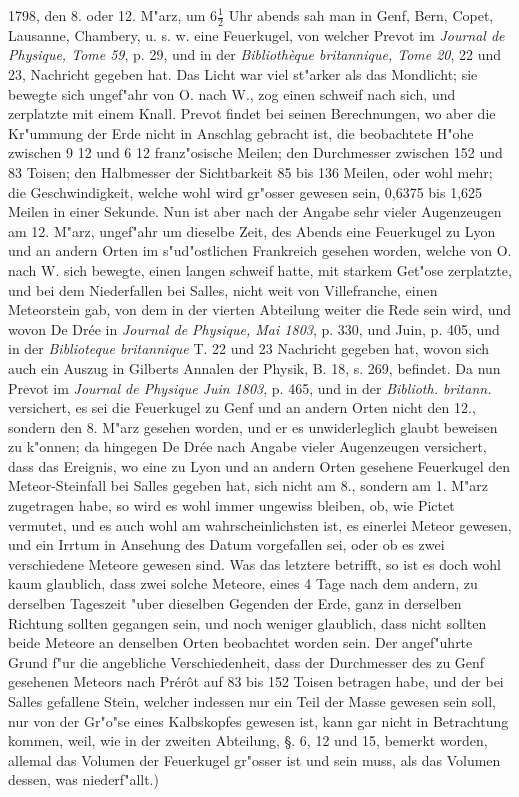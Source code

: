 \documentclass[a4paper, 11pt, oneside, polutonikogreek, german]{article}
\begin{document}
1798, den 8. oder 12. M"arz, um $\mathfrak{6\frac{1}{2}}$ Uhr abends sah man in Genf, Bern, Copet, Lausanne, Chambery, u. s. w. eine Feuerkugel, von welcher Prevot im \emph{Journal de Physique, Tome 59}, p. 29, und in der \emph{Bibliothèque britannique, Tome 20}, 22 und 23, Nachricht gegeben hat. Das Licht war viel st"arker als das Mondlicht; sie bewegte sich ungef"ahr von O. nach W., zog einen schweif nach sich, und zerplatzte mit einem Knall. Prevot findet bei seinen Berechnungen, wo aber die Kr"ummung der Erde nicht in Anschlag gebracht ist, die beobachtete H"ohe zwischen 9 12 und 6 12 franz"osische Meilen; den Durchmesser zwischen 152 und 83 Toisen; den Halbmesser der Sichtbarkeit 85 bis 136 Meilen, oder wohl mehr; die Geschwindigkeit, welche wohl wird gr"osser gewesen sein, 0,6375 bis 1,625 Meilen in einer Sekunde. Nun ist aber nach der Angabe sehr vieler Augenzeugen am 12. M"arz, ungef"ahr um dieselbe Zeit, des Abends eine Feuerkugel zu Lyon und an andern Orten im s"ud"ostlichen Frankreich gesehen worden, welche von O. nach W. sich bewegte, einen langen schweif hatte, mit starkem Get"ose zerplatzte, und bei dem Niederfallen bei Salles, nicht weit von Villefranche, einen Meteorstein gab, von dem in der vierten Abteilung weiter die Rede sein wird, und wovon De Drée in \emph{Journal de Physique, Mai 1803}, p. 330, und Juin, p. 405, und in der \emph{Biblioteque britannique} T. 22 und 23 Nachricht gegeben hat, wovon sich auch ein Auszug in Gilberts Annalen der Physik, B. 18, s. 269, befindet. Da nun Prevot im \emph{Journal de Physique Juin 1803}, p. 465, und in der \emph{Biblioth. britann.} versichert, es sei die Feuerkugel zu Genf und an andern Orten nicht den 12., sondern den 8. M"arz gesehen worden, und er es unwiderleglich glaubt beweisen zu k"onnen; da hingegen De Drée nach Angabe vieler Augenzeugen versichert, dass das Ereignis, wo eine zu Lyon und an andern Orten gesehene Feuerkugel den Meteor-Steinfall bei Salles gegeben hat, sich nicht am 8., sondern am 1. M"arz zugetragen habe, so wird es wohl immer ungewiss bleiben, ob, wie Pictet vermutet, und es auch wohl am wahrscheinlichsten ist, es einerlei Meteor gewesen, und ein Irrtum in Ansehung des Datum vorgefallen sei, oder ob es zwei verschiedene Meteore gewesen sind. Was das letztere betrifft, so ist es doch wohl kaum glaublich, dass zwei solche Meteore, eines 4 Tage nach dem andern, zu derselben Tageszeit "uber dieselben Gegenden der Erde, ganz in derselben Richtung sollten gegangen sein, und noch weniger glaublich, dass nicht sollten beide Meteore an denselben Orten beobachtet worden sein. Der angef"uhrte Grund f"ur die angebliche Verschiedenheit, dass der Durchmesser des zu Genf gesehenen Meteors nach Prérôt auf 83 bis 152 Toisen betragen habe, und der bei Salles gefallene Stein, welcher indessen nur ein Teil der Masse gewesen sein soll, nur von der Gr"o"se eines Kalbskopfes gewesen ist, kann gar nicht in Betrachtung kommen, weil, wie in der zweiten Abteilung, §. 6, 12 und 15, bemerkt worden, allemal das Volumen der Feuerkugel gr"osser ist und sein muss, als das Volumen dessen, was niederf"allt.)
\end{document}
